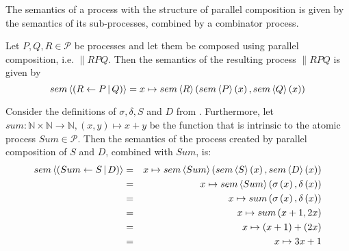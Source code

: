 The semantics of a process with the structure of parallel composition is given by the semantics of its sub-processes, combined by a combinator process.
\begin{definition}
\label{def:sem_parallel}
Let $P, Q, R \in \mathcal{P}$ be processes and let them be composed using parallel composition, i.e. $\parallel{R}{P}{Q}$. Then the semantics of the resulting process $\parallel{R}{P}{Q}$ is given by
  \begin{equation*}
    \label{eqn:sem_parallel}
    sem \left\langle \left( R \gets P \, | \, Q \right) \right\rangle = x \mapsto sem \left\langle R \right\rangle \left( sem \left\langle P \right\rangle \left( x \right), sem \left\langle Q \right\rangle \left( x \right) \right)
  \end{equation*}
  \hfill\qedsymbol
\end{definition}


\begin{example}
\label{exp:sem_parallel}
Consider the definitions of $\sigma, \delta, S$ and $D$ from . Furthermore, let $sum \colon \mathbb{N} \times \mathbb{N} \to \mathbb{N}, \left( x, y \right) \mapsto x + y$ be the function that is intrinsic to the atomic process $Sum \in \mathcal{P}$. Then the semantics of the process created by parallel composition of $S$ and $D$, combined with $Sum$, is: 
  \begin{eqnarray*}
    sem \left\langle \left( Sum \gets S \, | \, D \right) \right\rangle & = & x \mapsto sem \left\langle Sum \right\rangle{\left( sem \left\langle S \right\rangle \left( x \right), sem \left\langle D \right\rangle \left( x \right) \right)} \\
                               & = & x \mapsto sem \left\langle Sum \right\rangle{\left( \sigma\left(x\right), \delta\left(x\right) \right)} \\
                               & = & x \mapsto sum \left( \sigma\left(x\right), \delta\left(x\right) \right) \\
                               & = & x \mapsto sum \left( x+1, 2x \right) \\
                               & = & x \mapsto \left( x+1 \right) + \left( 2x \right) \\
                               & = & x \mapsto 3x + 1
  \end{eqnarray*}
\end{example}


